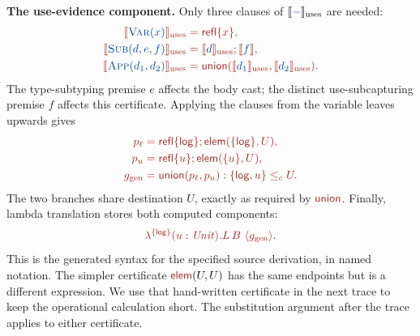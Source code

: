 \textbf{The use-evidence component.}
Only three clauses of $\tr{-}_{\mathrm{uses}}$ are needed:
\[
\tgt{\begin{aligned}
 \tr{\textsc{Var}(x)}_{\mathrm{uses}}&=\ev{refl}\{x\},\\
 \tr{\textsc{Sub}(d,e,f)}_{\mathrm{uses}}
     &=\tr{d}_{\mathrm{uses}};\tr{f},\\
 \tr{\textsc{App}(d_1,d_2)}_{\mathrm{uses}}
     &=\ev{union}(\tr{d_1}_{\mathrm{uses}},
                  \tr{d_2}_{\mathrm{uses}}).
\end{aligned}}
\]
The type-subtyping premise $e$ affects the body cast; the distinct
use-subcapturing premise $f$ affects this certificate.
Applying the clauses from the variable leaves upwards gives
\[
\tgt{\begin{aligned}
 p_\ell&=\ev{refl}\{\ev{log}\};
                  \ev{elem}(\{\ev{log}\},U),\\
 p_u&=\ev{refl}\{u\};\ev{elem}(\{u\},U),\\
 g_{\mathrm{gen}}&=\ev{union}(p_\ell,p_u):
                     \{\ev{log},u\}\le_c U.
\end{aligned}}
\]
The two branches share destination $U$, exactly as required by
$\ev{union}$. Finally, lambda translation stores both computed components:
\[
 \tgt{\lambda^{\{\ev{log}\}}(u:\ty{Unit}).
                 L\,B\ \langle g_{\mathrm{gen}}\rangle.}
\]
This is the generated syntax for the specified source derivation, in
named notation. The simpler certificate $\ev{elem}(U,U)$ has the same
endpoints but is a different expression. We use that hand-written
certificate in the next trace to keep the operational calculation short.
The substitution argument after the trace applies to either certificate.
